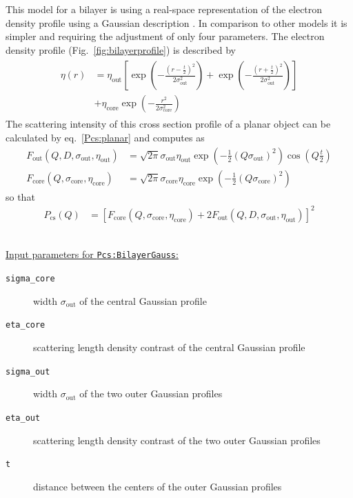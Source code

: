 This model for a bilayer is using a real-space representation of the electron density profile
using a Gaussian description \cite{Pabst2000,Pabst2003}. In comparison to other models it
is simpler and requiring the adjustment of only four parameters. The electron density profile
(Fig.\ \ref{fig:bilayerprofile}) is described by
\begin{align}
\begin{split}
\eta(r) &=  \eta_\textrm{out} \left[ \exp\left(-\frac{\left(r-\frac{t}{2}\right)^2}{2\sigma_\textrm{out}^2}\right) +
   \exp\left(-\frac{\left(r+\frac{t}{2}\right)^2}{2\sigma_\textrm{out}^2}\right) \right] \\
          &+ \eta_\textrm{core} \exp\left(-\frac{r^2}{2\sigma_\textrm{core}^2}\right)
          \label{eq:BiLayerGaussianProfile}
\end{split}
\end{align}
The scattering intensity of this cross section profile of a planar object can be calculated by eq.\ \ref{Pcs:planar}
and computes as
\begin{align}
   F_\text{out}\left(Q,D,\sigma_\textrm{out},\eta_\textrm{out}\right)  &= \sqrt{2\pi}\sigma_\textrm{out}  \eta_\textrm{out}  \exp\left(-\frac{1}{2}\left(Q\sigma_\textrm{out} \right)^2\right) \cos\left(Q\frac{t}{2}\right) \\
   F_\text{core}\left(Q,\sigma_\textrm{core},\eta_\textrm{core}\right) &= \sqrt{2\pi}\sigma_\textrm{core} \eta_\textrm{core} \exp\left(-\frac{1}{2}\left(Q\sigma_\textrm{core}\right)^2\right)
\end{align}
so that
\begin{align}
  P_\text{cs}\left(Q\right)   &=\left[F_\text{core}\left(Q,\sigma_\textrm{core}, \eta_\textrm{core}\right)
                                   +2 F_\text{out} \left(Q,D,\sigma_\textrm{out},\eta_\textrm{out} \right)\right]^2
  \label{eq:PcsBilayer}
\end{align}

\vspace{5mm}

\hspace{1pt}\\
\uline{Input parameters for \texttt{Pcs:BilayerGauss}:}
\begin{description}
    \item[\texttt{sigma\_core}] width $\sigma_\mathrm{out}$ of the central Gaussian profile
    \item[\texttt{eta\_core}] scattering length density contrast of the central Gaussian profile
    \item[\texttt{sigma\_out}] width $\sigma_\mathrm{out}$ of the two outer Gaussian profiles
    \item[\texttt{eta\_out}] scattering length density contrast of the two outer Gaussian profiles
    \item[\texttt{t}] distance between the centers of the outer Gaussian profiles
\end{description}

